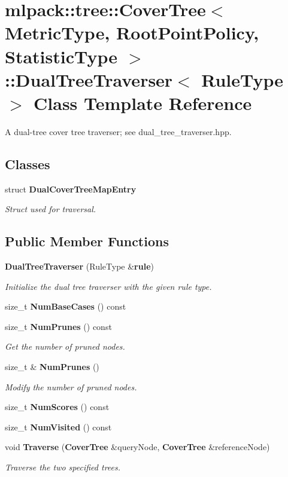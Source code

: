 \section{mlpack\-:\-:tree\-:\-:Cover\-Tree$<$ Metric\-Type, Root\-Point\-Policy, Statistic\-Type $>$\-:\-:Dual\-Tree\-Traverser$<$ Rule\-Type $>$ Class Template Reference}
\label{classmlpack_1_1tree_1_1CoverTree_1_1DualTreeTraverser}


A dual-\/tree cover tree traverser; see dual\-\_\-tree\-\_\-traverser.\-hpp.  


\subsection*{Classes}
\begin{DoxyCompactItemize}
\item 
struct {\bf Dual\-Cover\-Tree\-Map\-Entry}
\begin{DoxyCompactList}\small\item\em Struct used for traversal. \end{DoxyCompactList}\end{DoxyCompactItemize}
\subsection*{Public Member Functions}
\begin{DoxyCompactItemize}
\item 
{\bf Dual\-Tree\-Traverser} (Rule\-Type \&{\bf rule})
\begin{DoxyCompactList}\small\item\em Initialize the dual tree traverser with the given rule type. \end{DoxyCompactList}\item 
size\-\_\-t {\bf Num\-Base\-Cases} () const 
\item 
size\-\_\-t {\bf Num\-Prunes} () const 
\begin{DoxyCompactList}\small\item\em Get the number of pruned nodes. \end{DoxyCompactList}\item 
size\-\_\-t \& {\bf Num\-Prunes} ()
\begin{DoxyCompactList}\small\item\em Modify the number of pruned nodes. \end{DoxyCompactList}\item 
size\-\_\-t {\bf Num\-Scores} () const 
\item 
size\-\_\-t {\bf Num\-Visited} () const 
\item 
void {\bf Traverse} ({\bf Cover\-Tree} \&query\-Node, {\bf Cover\-Tree} \&reference\-Node)
\begin{DoxyCompactList}\small\item\em Traverse the two specified trees. \end{DoxyCompactList}\end{DoxyCompactItemize}
